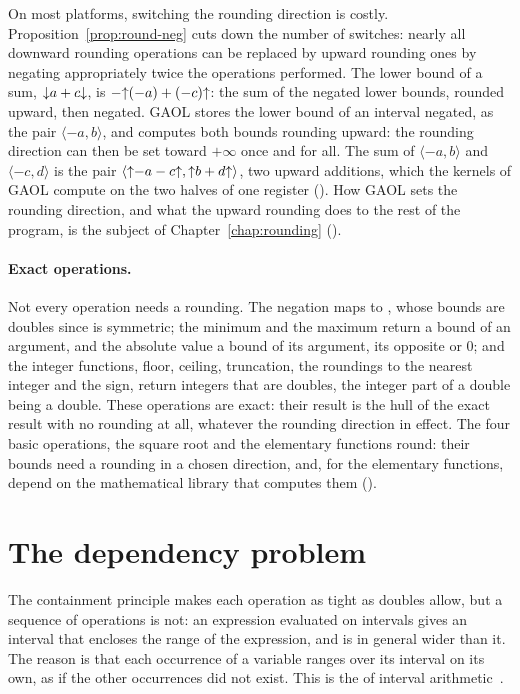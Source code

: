 \medskip
On most platforms, switching the rounding direction is costly.
Proposition~\ref{prop:round-neg} cuts down the number of switches: nearly
all downward rounding operations can be replaced by upward rounding ones by
negating appropriately twice the operations performed. The lower bound of a
sum, $\mathopen{\downarrow}a+c\mathclose{\downarrow}$, is $-\mathopen{\uparrow}(-a)+(-c)\mathclose{\uparrow}$: the sum of the negated
lower bounds, rounded upward, then negated. GAOL stores the lower bound of
an interval negated, as the pair $\langle -a, b\rangle$, and computes both
bounds rounding upward: the rounding direction can then be set toward
$+\infty$ once and for all. The sum of $\langle -a, b\rangle$ and
$\langle -c, d\rangle$ is the pair $\langle\mathopen{\uparrow}-a-c\mathclose{\uparrow},
\mathopen{\uparrow}b+d\mathclose{\uparrow}\rangle$, two upward additions, which the kernels of GAOL
compute on the two halves of one register (). How GAOL
sets the rounding direction, and what the upward rounding does to the rest
of the program, is the subject of Chapter~\ref{chap:rounding}
().
%

\paragraph{Exact operations.} Not every operation needs a rounding. The
negation maps  to , whose bounds are doubles since
\FSet{} is symmetric; the minimum and the maximum return a bound of an argument,
and the absolute value a bound of its argument, its opposite or $0$; and the
integer functions, floor,
ceiling, truncation, the roundings to the nearest integer and the sign,
return integers that are doubles, the integer part of a double being a
double. These operations are exact: their result is the hull of the exact
result with no rounding at all, whatever the rounding direction in effect.
The four basic operations, the square root and the elementary functions
round: their bounds need a rounding in a chosen direction, and, for the
elementary functions, depend on the mathematical library that computes them
().
%

\section{The dependency problem}\label{sec:dependency}
%

The containment principle makes each operation as tight as doubles allow,
but a sequence of operations is not: an expression evaluated on intervals
gives an interval that encloses the range of the expression, and is in
general wider than it. The reason is that each occurrence of a variable
ranges over its interval on its own, as if the other occurrences did not
exist. This is the  of interval
arithmetic~\cite{Moore:Book1966,Neumaier:Book1990}.

